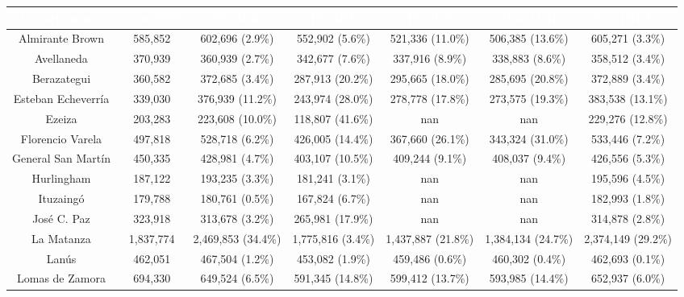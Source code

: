 \documentclass{article}
\theoremstyle{mytheoremstyle}
\theoremstyle{mytheoremstyle}
\theoremstyle{myproblemstyle}
\begin{document}
 \begin{table}[htb]
  \centering
  \footnotesize
  \begin{tabular}{|c|c|c|c|c|c|c|}
  \hline
  \textbf{\cellcolor[rgb]{0,0.231,0.427}\textcolor{white}{Departamento}} & \textbf{\cellcolor[rgb]{0,0.231,0.427}\textcolor{white}{Censo2022}} & \textbf{\cellcolor[rgb]{0,0.231,0.427}\textcolor{white}{PredLR}} & \textbf{\cellcolor[rgb]{0,0.231,0.427}\textcolor{white}{PredRT}} & \textbf{\cellcolor[rgb]{0,0.231,0.427}\textcolor{white}{PredRF}} & \textbf{\cellcolor[rgb]{0,0.231,0.427}\textcolor{white}{PredLGB}} & \textbf{\cellcolor[rgb]{0,0.231,0.427}\textcolor{white}{PredINDEC}} \\ \hline
  Almirante Brown & 585,852 & 602,696 (2.9\%) & 552,902 (5.6\%) & 521,336 (11.0\%) & 506,385 (13.6\%) & 605,271 (3.3\%) \\
  Avellaneda & 370,939 & 360,939 (2.7\%) & 342,677 (7.6\%) & 337,916 (8.9\%) & 338,883 (8.6\%) & 358,512 (3.4\%) \\
  Berazategui & 360,582 & 372,685 (3.4\%) & 287,913 (20.2\%) & 295,665 (18.0\%) & 285,695 (20.8\%) & 372,889 (3.4\%) \\
  Esteban Echeverría & 339,030 & 376,939 (11.2\%) & 243,974 (28.0\%) & 278,778 (17.8\%) & 273,575 (19.3\%) & 383,538 (13.1\%) \\
  Ezeiza & 203,283 & 223,608 (10.0\%) & 118,807 (41.6\%) & nan & nan & 229,276 (12.8\%) \\
  Florencio Varela & 497,818 & 528,718 (6.2\%) & 426,005 (14.4\%) & 367,660 (26.1\%) & 343,324 (31.0\%) & 533,446 (7.2\%) \\
  General San Martín & 450,335 & 428,981 (4.7\%) & 403,107 (10.5\%) & 409,244 (9.1\%) & 408,037 (9.4\%) & 426,556 (5.3\%) \\
  Hurlingham & 187,122 & 193,235 (3.3\%) & 181,241 (3.1\%) & nan & nan & 195,596 (4.5\%) \\
  Ituzaingó & 179,788 & 180,761 (0.5\%) & 167,824 (6.7\%) & nan & nan & 182,993 (1.8\%) \\
  José C. Paz & 323,918 & 313,678 (3.2\%) & 265,981 (17.9\%) & nan & nan & 314,878 (2.8\%) \\
  La Matanza & 1,837,774 & 2,469,853 (34.4\%) & 1,775,816 (3.4\%) & 1,437,887 (21.8\%) & 1,384,134 (24.7\%) & 2,374,149 (29.2\%) \\
  Lanús & 462,051 & 467,504 (1.2\%) & 453,082 (1.9\%) & 459,486 (0.6\%) & 460,302 (0.4\%) & 462,693 (0.1\%) \\
  Lomas de Zamora & 694,330 & 649,524 (6.5\%) & 591,345 (14.8\%) & 599,412 (13.7\%) & 593,985 (14.4\%) & 652,937 (6.0\%) \\

\end{tabular}
\end{table}
\end{document}
